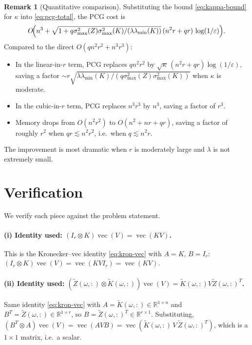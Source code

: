 \documentclass[12pt]{article}
\theoremstyle{definition}
\newtheorem{remark}[theorem]{Remark}
\newcommand{\vecop}{\operatorname{vec}}
\newcommand{\R}{\mathbb{R}}
\newcommand{\Kt}{\widetilde{K}}
\newcommand{\Zt}{\widetilde{Z}}
\begin{document}
\begin{remark}[Quantitative comparison]\label{rmk:compare}
Substituting the bound \eqref{eq:kappa-bound} for $\kappa$ into \eqref{eq:pcg-total}, the PCG
cost is
\[
O\!\Bigl(n^3 + \sqrt{1+q\sigma_{\max}^2(Z)\sigma_{\max}^2(K)/(\lambda\lambda_{\min}(K))}\,(n^2 r + qr)\,\log(1/\varepsilon)\Bigr).
\]
Compared to the direct $O(qn^2r^2+n^3r^3)$:
\begin{itemize}
\item In the linear-in-$r$ term, PCG replaces $qn^2r^2$ by $\sqrt\kappa\,(n^2 r+qr)\log(1/\varepsilon)$,
saving a factor $\sim r\sqrt{\lambda\lambda_{\min}(K)/(q\sigma_{\max}^2(Z)\sigma_{\max}^2(K))}$
when $\kappa$ is moderate.
\item In the cubic-in-$r$ term, PCG replaces $n^3r^3$ by $n^3$, saving a factor of $r^3$.
\item Memory drops from $O(n^2r^2)$ to $O(n^2+nr+qr)$, saving a factor of roughly $r^2$ when
$qr\lesssim n^2 r^2$, i.e.\ when $q\lesssim n^2 r$.
\end{itemize}
The improvement is most dramatic when $r$ is moderately large and $\lambda$ is not extremely
small.
\end{remark}

\section{Verification}\label{sec:verify}

We verify each piece against the problem statement.

\paragraph{(i) Identity used: $(I_r\otimes K)\vecop(V)=\vecop(KV)$.}
This is the Kronecker--vec identity \eqref{eq:kron-vec} with $A=K$, $B=I_r$:
$(I_r\otimes K)\vecop(V)=\vecop(K V I_r)=\vecop(KV)$. \checkmark

\paragraph{(ii) Identity used: $(\Zt(\omega,:)\otimes\Kt(\omega,:))\vecop(V)=\Kt(\omega,:)V\Zt(\omega,:)^T$.}
Same identity \eqref{eq:kron-vec} with $A=\Kt(\omega,:)\in\R^{1\times n}$ and
$B^T=\Zt(\omega,:)\in\R^{1\times r}$, so $B=\Zt(\omega,:)^T\in\R^{r\times 1}$. Substituting,
$(B^T\otimes A)\vecop(V)=\vecop(A V B)=\vecop(\Kt(\omega,:)\,V\,\Zt(\omega,:)^T)$, which is a
$1\times 1$ matrix, i.e.\ a scalar. \checkmark
\end{document}
